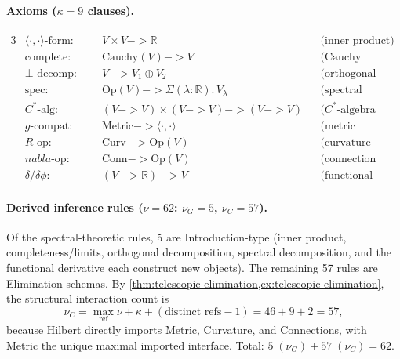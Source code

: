 \documentclass[11pt,a4paper]{article}
\def\to{->}%
\def\nabla{nabla}%
\theoremstyle{plain}
\theoremstyle{definition}
\theoremstyle{remark}
\newcommand{\R}{\mathbb{R}}
\begin{document}
\paragraph{Axioms ($\kappa = 9$ clauses).}
\begin{alignat*}{3}
    &\langle\cdot,\cdot\rangle\text{-form:} &\quad& V \times V \to \R
        && \text{(inner product)} \\
    &\mathrm{complete}\text{:}               && \mathrm{Cauchy}(V) \to V
        && \text{(Cauchy completeness)} \\
    &\perp\text{-decomp:}                    && V \to V_1 \oplus V_2
        && \text{(orthogonal decomposition)} \\
    &\mathrm{spec}\text{:}                   && \mathrm{Op}(V) \to \Sigma(\lambda : \R).\, V_\lambda
        && \text{(spectral decomposition)} \\
    &C^*\text{-alg:}                         && (V \to V) \times (V \to V) \to (V \to V)
        && \text{($C^*$-algebra structure)} \\
    &g\text{-compat:}                        && \mathrm{Metric} \to \langle\cdot,\cdot\rangle
        && \text{(metric compatibility)} \\
    &R\text{-op:}                            && \mathrm{Curv} \to \mathrm{Op}(V)
        && \text{(curvature operator)} \\
    &\nabla\text{-op:}                       && \mathrm{Conn} \to \mathrm{Op}(V)
        && \text{(connection operator)} \\
    &\delta/\delta\phi\text{:}               && (V \to \R) \to V
        && \text{(functional derivative)}
\end{alignat*}

\paragraph{Derived inference rules ($\nu = 62$: $\nu_G = 5$, $\nu_C = 57$).}
Of the spectral-theoretic rules, 5 are Introduction-type (inner product, completeness/limits, orthogonal decomposition, spectral decomposition, and the functional derivative each construct new objects).
The remaining 57 rules are Elimination schemas.
By \cref{thm:telescopic-elimination,ex:telescopic-elimination}, the structural interaction count is
\[
  \nu_C
  =
  \max_{\mathrm{ref}} \nu + \kappa + (\text{distinct refs} - 1)
  =
  46 + 9 + 2
  =
  57,
\]
because Hilbert directly imports Metric, Curvature, and Connections, with Metric the unique maximal imported interface.
Total: $5\;(\nu_G) + 57\;(\nu_C) = 62$.
\end{document}
